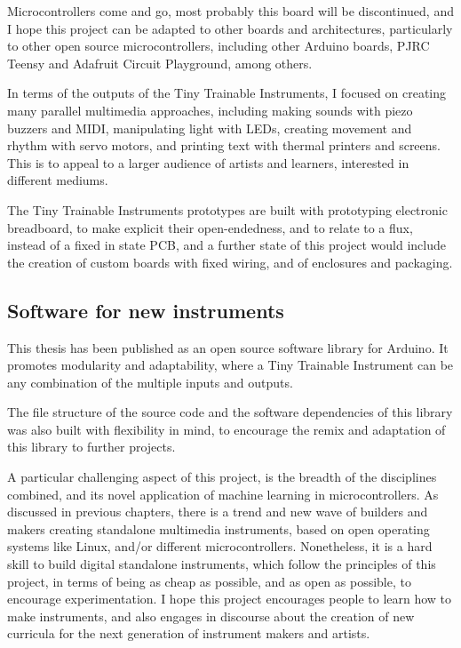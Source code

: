 Microcontrollers come and go, most probably this board will be discontinued, and I hope this project can be adapted to other boards and architectures, particularly to other open source microcontrollers, including other Arduino boards, PJRC Teensy and Adafruit Circuit Playground, among others.

In terms of the outputs of the Tiny Trainable Instruments, I focused on creating many parallel multimedia approaches, including making sounds with piezo buzzers and MIDI, manipulating light with LEDs, creating movement and rhythm with servo motors, and printing text with thermal printers and screens. This is to appeal to a larger audience of artists and learners, interested in different mediums.

The Tiny Trainable Instruments prototypes are built with prototyping electronic breadboard, to make explicit their open-endedness, and to relate to a flux, instead of a fixed in state PCB, and a further state of this project would include the creation of custom boards with fixed wiring, and of enclosures and packaging.


\subsection{Software for new instruments}

This thesis has been published as an open source software library for Arduino. It promotes modularity and adaptability, where a Tiny Trainable Instrument can be any combination of the multiple inputs and outputs.

The file structure of the source code and the software dependencies of this library was also built with flexibility in mind, to encourage the remix and adaptation of this library to further projects.

A particular challenging aspect of this project, is the breadth of the disciplines combined, and its novel application of machine learning in microcontrollers. As discussed in previous chapters, there is a trend and new wave of builders and makers creating standalone multimedia instruments, based on open operating systems like Linux, and/or different microcontrollers. Nonetheless, it is a hard skill to build digital standalone instruments, which follow the principles of this project, in terms of being as cheap as possible, and as open as possible, to encourage experimentation. I hope this project encourages people to learn how to make instruments, and also engages in discourse about the creation of new curricula for the next generation of instrument makers and artists.


